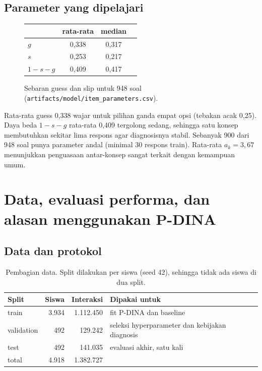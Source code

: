 \documentclass[11pt,a4paper]{article}
\begin{document}
\subsection{Parameter yang dipelajari}

\begin{figure}[h]
  \centering
  \setlength\figH{5.2cm}
  \begin{minipage}{0.62\linewidth}\end{minipage}\hfill
  \begin{minipage}{0.35\linewidth}\small
    \begin{tabular}{@{}lccc@{}}
      \toprule
      & rata-rata & median \\
      \midrule
      $g$ & 0,338 & 0,317 \\
      $s$ & 0,253 & 0,217 \\
      $1-s-g$ & 0,409 & 0,417 \\
      \bottomrule
    \end{tabular}
  \end{minipage}
  \caption{Sebaran guess dan slip untuk 948 soal (\texttt{artifacts/model/item\_parameters.csv}).}
\end{figure}

Rata-rata guess 0,338 wajar untuk pilihan ganda empat opsi (tebakan acak 0,25). Daya beda $1-s-g$ rata-rata 0,409
tergolong sedang, sehingga satu konsep membutuhkan sekitar lima respons agar diagnosisnya stabil. Sebanyak 900 dari
948 soal punya parameter andal (minimal 30 respons train). Rata-rata $a_k=3{,}67$ menunjukkan penguasaan antar-konsep
sangat terkait dengan kemampuan umum.

\section{Data, evaluasi performa, dan alasan menggunakan P-DINA}

\subsection{Data dan protokol}

\begin{table}[h]
  \centering\small
  \begin{tabular}{@{}lrrl@{}}
    \toprule
    Split & Siswa & Interaksi & Dipakai untuk \\
    \midrule
    train & 3.934 & 1.112.450 & fit P-DINA dan baseline \\
    validation & 492 & 129.242 & seleksi hyperparameter dan kebijakan diagnosis \\
    test & 492 & 141.035 & evaluasi akhir, satu kali \\
    \midrule
    total & 4.918 & 1.382.727 & \\
    \bottomrule
  \end{tabular}
  \caption{Pembagian data. Split dilakukan per siswa (seed 42), sehingga tidak ada siswa di dua split.}
\end{table}
\end{document}
